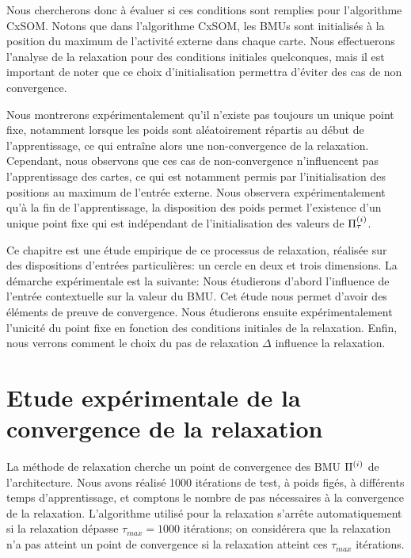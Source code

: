 \documentclass[../main]{subfiles}
\begin{document}
Nous chercherons donc à évaluer si ces conditions sont remplies pour l'algorithme CxSOM. 
Notons que dans l'algorithme CxSOM, les BMUs sont initialisés à la position du maximum de l'activité externe dans chaque carte. 
Nous effectuerons l'analyse de la relaxation pour des conditions initiales quelconques, mais il est important de noter que ce choix d'initialisation permettra d'éviter des cas de non convergence.

Nous montrerons expérimentalement qu'il n'existe pas toujours un unique point fixe, notamment lorsque les poids sont aléatoirement répartis au début de l'apprentissage, ce qui entraîne alors une non-convergence de la relaxation. 
Cependant, nous observons que ces cas de non-convergence n'influencent pas l'apprentissage des cartes, ce qui est notamment permis par l'initialisation des positions au maximum de l'entrée externe.
Nous observera expérimentalement qu'à la fin de l'apprentissage, la disposition des poids permet l'existence d'un unique point fixe qui est indépendant de l'initialisation des valeurs de $\Pi^{({i})}_{\tau}$.

Ce chapitre est une étude empirique de ce processus de relaxation, réalisée sur des dispositions d'entrées particulières: un cercle en deux et trois dimensions.
La démarche expérimentale est la suivante:
Nous étudierons d'abord l'influence de l'entrée contextuelle sur la valeur du BMU. Cet étude nous permet d'avoir des éléments de preuve de convergence.
Nous étudierons ensuite expérimentalement l'unicité du point fixe en fonction des conditions initiales de la relaxation.
Enfin, nous verrons comment le choix du pas de relaxation $\Delta$ influence la relaxation.

\section{Etude expérimentale de la convergence de la relaxation}

La méthode de relaxation cherche un point de convergence des BMU $\Pi^{({i})}$ de l'architecture. Nous avons réalisé 1000 itérations de test, à poids figés, à différents temps d'apprentissage, et comptons le nombre de pas nécessaires à la convergence de la relaxation. L'algorithme utilisé pour la relaxation s'arrête automatiquement si la relaxation dépasse $\tau_{max}= 1000$ itérations; on considérera que la relaxation n'a pas atteint un point de convergence si la relaxation atteint ces $\tau_{max}$ itérations.
\end{document}
